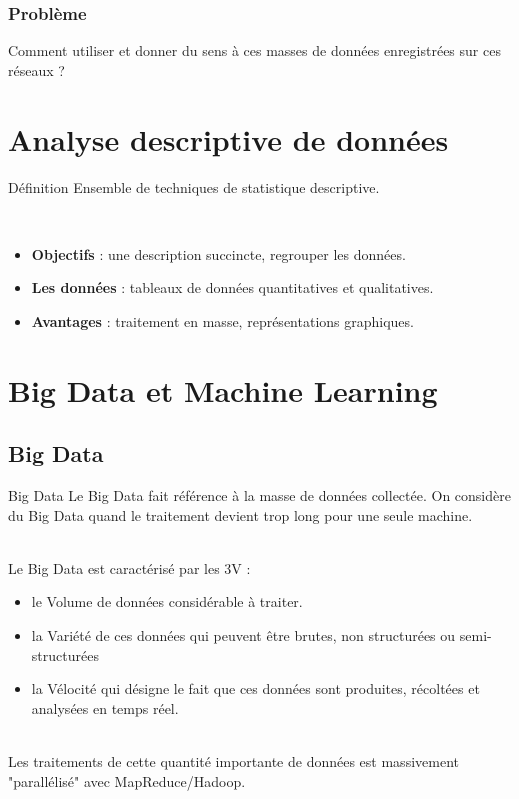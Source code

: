 	\begin{frame}
	\frametitle{Problème}
		Comment utiliser et donner du sens à ces masses de données enregistrées sur ces réseaux ?
	\end{frame}
	
	\section{Analyse descriptive de données}
	\begin{frame}
		\begin{block}{Définition}
		Ensemble de techniques de statistique descriptive.
		\end{block}
		~\\
		\begin{itemize}
		\pause\item \textbf{Objectifs} : une description succincte, regrouper les données.
		\pause\item \textbf{Les données} : tableaux de données quantitatives et qualitatives.
		\pause\item \textbf{Avantages} : traitement en masse, représentations graphiques.
		\end{itemize}
	\end{frame}
	
	\section{Big Data et Machine Learning}
	\subsection{Big Data}
	\begin{frame}
		\begin{block}{Big Data}
		Le Big Data fait référence à la masse de données collectée. On considère du Big Data quand le traitement devient trop long pour une seule machine.
		\end{block}
		~\\
		\pause
		Le Big Data est caractérisé par les 3V : 
		\begin{itemize}
			\pause\item le Volume de données considérable à traiter.
			\pause\item la Variété de ces données qui peuvent être brutes, non structurées ou semi-structurées
			\pause\item la Vélocité qui désigne le fait que ces données sont produites, récoltées et analysées en temps réel.
		\end{itemize}
		~\\
		\pause
		Les traitements de cette quantité importante de données est massivement "parallélisé" avec MapReduce/Hadoop. 
	\end{frame}
